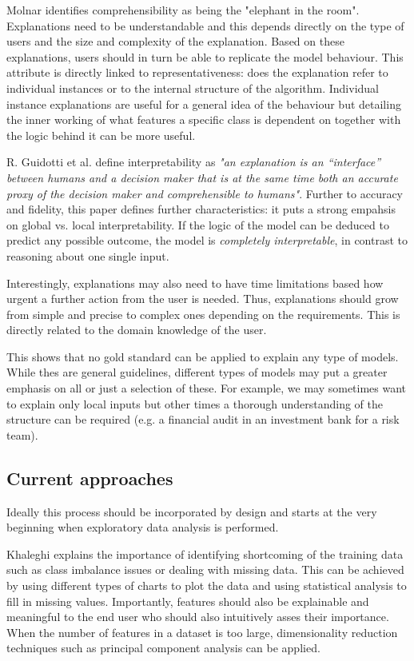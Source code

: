 \documentclass[proposal]{softeng}
\begin{document}
Molnar identifies comprehensibility as being the "elephant in the room". Explanations need to be understandable and this depends directly on the type of users and the size and complexity of the explanation. Based on these explanations, users should in turn be able to replicate the model behaviour. This attribute is directly linked to representativeness: does the explanation refer to individual instances or to the internal structure of the algorithm. Individual instance explanations are useful for a general idea of the behaviour but detailing the inner working of what features a specific class is dependent on together with the logic behind it can be more useful.

R. Guidotti et al. \cite{guidotti} define interpretability as \textit{"an explanation is an
“interface” between humans and a decision maker that is at the same time both an accurate proxy of the decision maker and comprehensible to humans"}. Further to accuracy and fidelity, this paper defines further characteristics: it puts a strong empahsis on global vs. local interpretability. If the logic of the model can be deduced to predict any possible outcome, the model is \textit{completely interpretable}, in contrast to reasoning about one single input. 

Interestingly, explanations may also need to have time limitations based how urgent a further action from the user is needed. Thus, explanations should grow from simple and precise to complex ones depending on the requirements. This is directly related to the domain knowledge of the user.

This shows that no gold standard can be applied to explain any type of models. While thes are general guidelines, different types of models may put a greater emphasis on all or just a selection of these. For example, we may sometimes want to explain only local inputs but other times a thorough understanding of the structure can be required (e.g. a financial audit in an investment bank for a risk team).

\subsection{Current approaches}

Ideally this process should be incorporated by design and starts at the very beginning when exploratory data analysis is performed. 

Khaleghi \cite{khaleghi} explains the importance of identifying shortcoming of the training data such as class imbalance issues or dealing with missing data. This can be achieved by using different types of charts to plot the data and using statistical analysis to fill in missing values. Importantly, features should also be explainable and meaningful to the end user who should also intuitively asses their importance. When the number of features in a dataset is too large, dimensionality reduction techniques such as principal component analysis can be applied.
\end{document}
